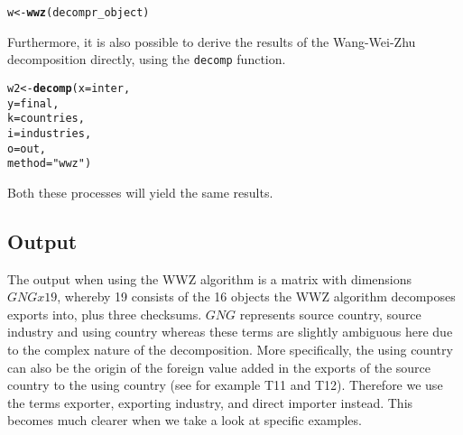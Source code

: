 \documentclass[a4paper]{article}\usepackage[]{graphicx}\usepackage[]{color}
\makeatletter
\newcommand{\hlstr}[1]{\textcolor[rgb]{0.192,0.494,0.8}{#1}}%
\newcommand{\hlstd}[1]{\textcolor[rgb]{0.345,0.345,0.345}{#1}}%
\newcommand{\hlkwb}[1]{\textcolor[rgb]{0.69,0.353,0.396}{#1}}%
\newcommand{\hlkwc}[1]{\textcolor[rgb]{0.333,0.667,0.333}{#1}}%
\newcommand{\hlkwd}[1]{\textcolor[rgb]{0.737,0.353,0.396}{\textbf{#1}}}%
\newenvironment{kframe}{%
 \def\at@end@of@kframe{}%
 \ifinner\ifhmode%
  \def\at@end@of@kframe{\end{minipage}}%
  \begin{minipage}{\columnwidth}%
 \fi\fi%
 \def\FrameCommand##1{\hskip\@totalleftmargin \hskip-\fboxsep
 \colorbox{shadecolor}{##1}\hskip-\fboxsep
     \hskip-\linewidth \hskip-\@totalleftmargin \hskip\columnwidth}%
 \MakeFramed {\advance\hsize-\width
   \@totalleftmargin\z@ \linewidth\hsize
   \@setminipage}}%
 {\par\unskip\endMakeFramed%
 \at@end@of@kframe}
\newenvironment{knitrout}{}{} %
\makeatother
\begin{document}
\begin{knitrout}
\color{fgcolor}\begin{kframe}
\begin{alltt}
\hlstd{w} \hlkwb{<-} \hlkwd{wwz}\hlstd{(decompr_object)}
\end{alltt}
\end{kframe}
\end{knitrout}

Furthermore, it is also possible to derive the results of the Wang-Wei-Zhu decomposition directly, using the \verb!decomp! function.

\begin{knitrout}
\color{fgcolor}\begin{kframe}
\begin{alltt}
\hlstd{w2} \hlkwb{<-}  \hlkwd{decomp}\hlstd{(} \hlkwc{x} \hlstd{= inter,}
               \hlkwc{y} \hlstd{= final,}
               \hlkwc{k} \hlstd{= countries,}
               \hlkwc{i} \hlstd{= industries,}
               \hlkwc{o} \hlstd{= out,}
               \hlkwc{method} \hlstd{=} \hlstr{"wwz"} \hlstd{)}
\end{alltt}
\end{kframe}
\end{knitrout}

Both these processes will yield the same results.

\subsection{Output}
The output when using the WWZ algorithm is a matrix with dimensions $GNGx19$, 
whereby 19 consists of the 16 objects the WWZ algorithm decomposes exports into, plus three checksums. 
$GNG$ represents source country, source industry and using country whereas these terms are slightly ambiguous here due to the complex nature of the decomposition. 
More specifically, the using country can also be the origin of the foreign value added in the exports of the source country to the using country (see for example T11 and T12). 
Therefore we use the terms exporter, exporting industry, and direct importer instead. 
This becomes much clearer when we take a look at specific examples.
\end{document}
